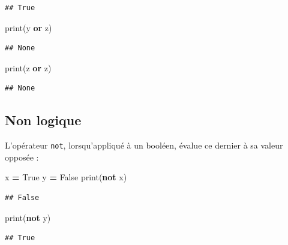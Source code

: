 \documentclass[12pt,]{book}
\newenvironment{Shaded}{\begin{snugshade}}{\end{snugshade}}
\newcommand{\KeywordTok}[1]{\textcolor[rgb]{0.13,0.29,0.53}{\textbf{#1}}}
\newcommand{\VariableTok}[1]{\textcolor[rgb]{0.00,0.00,0.00}{#1}}
\newcommand{\OperatorTok}[1]{\textcolor[rgb]{0.81,0.36,0.00}{\textbf{#1}}}
\newcommand{\BuiltInTok}[1]{#1}
\newcommand{\NormalTok}[1]{#1}
\numberwithin{equation}{section}
\numberwithin{countremarque}{section}
\begin{document}
\begin{lstlisting}
## True
\end{lstlisting}

\begin{Shaded}
\begin{Highlighting}[]
\BuiltInTok{print}\NormalTok{(y }\KeywordTok{or}\NormalTok{ z)}
\end{Highlighting}
\end{Shaded}

\begin{lstlisting}
## None
\end{lstlisting}

\begin{Shaded}
\begin{Highlighting}[]
\BuiltInTok{print}\NormalTok{(z }\KeywordTok{or}\NormalTok{ z)}
\end{Highlighting}
\end{Shaded}

\begin{lstlisting}
## None
\end{lstlisting}

\subsection{Non logique}\label{non-logique}

L'opérateur \texttt{not}, lorsqu'appliqué à un booléen, évalue ce
dernier à sa valeur opposée :

\begin{Shaded}
\begin{Highlighting}[]
\NormalTok{x }\OperatorTok{=} \VariableTok{True}
\NormalTok{y }\OperatorTok{=} \VariableTok{False}
\BuiltInTok{print}\NormalTok{(}\KeywordTok{not}\NormalTok{ x)}
\end{Highlighting}
\end{Shaded}

\begin{lstlisting}
## False
\end{lstlisting}

\begin{Shaded}
\begin{Highlighting}[]
\BuiltInTok{print}\NormalTok{(}\KeywordTok{not}\NormalTok{ y)}
\end{Highlighting}
\end{Shaded}

\begin{lstlisting}
## True
\end{lstlisting}
\end{document}
